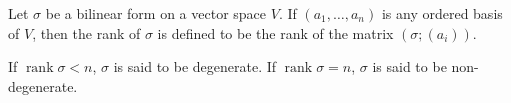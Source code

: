 Let $\sigma$ be a bilinear form on a vector space $V$. If $(a_1, \ldots, a_n)$ is any ordered basis of $V$, then the rank of $\sigma$ is defined to be the rank of the matrix $(\sigma; (a_i))$.

If $\operatorname{rank} \sigma < n$, $\sigma$ is said to be degenerate. If $\operatorname{rank} \sigma = n$, $\sigma$ is said to be non-degenerate.
